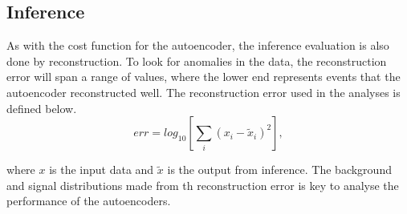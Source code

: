 


\subsection{Inference}\label{sec:ae_inference}
As with the cost function for the autoencoder, the inference evaluation is also done by reconstruction. 
To look for anomalies in the data, the reconstruction error will span a range of values, where the 
lower end represents events that the autoencoder reconstructed well. The reconstruction error used 
in the analyses is defined below. 
\begin{equation}
    err = log_{10} \left[ \sum_i (x_i - \tilde{x}_i)^2 \right],
\end{equation}

where $x$ is the input data and $\tilde{x}$ is the output from inference. The background and signal 
distributions made from th reconstruction error is key to analyse the performance of the autoencoders.
